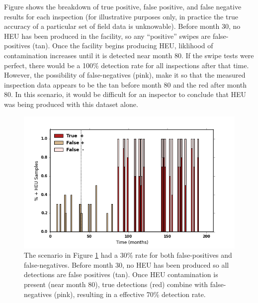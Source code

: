 Figure  shows the breakdown of true positive, false positive, and false negative results for each inspection (for illustrative purposes only, in practice the true accuracy of a particular set of field data is unknowable).  Before month 30, no \gls{HEU} has been produced in the facility, so any ``positive'' swipes are false-positives (tan). Once the facility begins producing \gls{HEU}, liklihood of contamination increases until it is detected near month 80. If the swipe tests were perfect, there would be a 100\% detection rate for all inspections after that time. However, the possibility of false-negatives (pink), make it so that the measured inspection data appears to be the tan before month 80 and the red after month 80.  In this scenario, it would be difficult for an inspector to conclude that \gls{HEU} was being produced with this dataset alone.

\begin{figure}%
\begin{center}
\includegraphics[natwidth=162bp,natheight=227bp, scale=0.6]{./figs/mm_5enr_lowtails_insp_200yrswipe_rates.png}
\end{center}
\caption{The scenario in Figure \ref{fig:signatures} had a 30\% rate for both false-positives and false-negatives. Before month 30, no HEU has been produced so all detections are false positives (tan). Once \gls{HEU} contamination is present (near month 80), true detections (red) combine with false-negatives (pink), resulting in a effective 70\% detection rate.}
\label{fig:signatures}
\end{figure}
